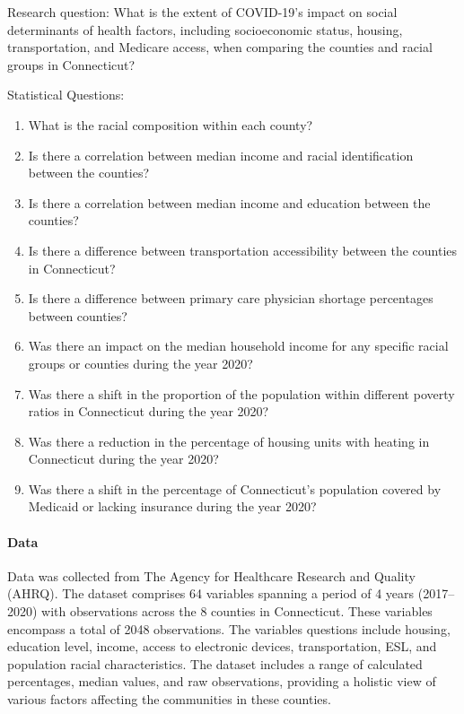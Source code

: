 \documentclass[12pt]{article}
\begin{document}
Research question: What is the extent of COVID-19's impact on social determinants of health factors, including socioeconomic status, housing, transportation, and Medicare access, when comparing the counties and racial groups in Connecticut? 

Statistical Questions:
\begin{enumerate}
\item
What is the racial composition within each county?
\item
Is there a correlation between median income and racial identification between the counties?
\item
Is there a correlation between median income and education between the counties?
\item
Is there a difference between transportation accessibility between the counties in Connecticut?
\item
Is there a difference between primary care physician shortage percentages between counties?
\item
Was there an impact on the median household income for any specific racial groups or counties during the year 2020?
\item
Was there a shift in the proportion of the population within different poverty ratios in Connecticut during the year 2020?
\item
Was there a reduction in the percentage of housing units with heating in Connecticut during the year 2020?
\item
Was there a shift in the percentage of Connecticut's population covered by Medicaid or lacking insurance during the year 2020?
\end{enumerate}


\paragraph{Data}
Data was collected from The Agency for Healthcare Research and Quality (AHRQ).
The dataset comprises 64 variables spanning a period of 4 years (2017--2020) 
with observations across the 8 counties in Connecticut. These variables encompass 
a total of 2048 observations. The variables questions include housing, education level, 
income, access to electronic devices, transportation, ESL, and population racial characteristics. 
The dataset includes a range of calculated percentages, median values, and raw observations, 
providing a holistic view of various factors affecting the communities in these counties. 
\end{document}
